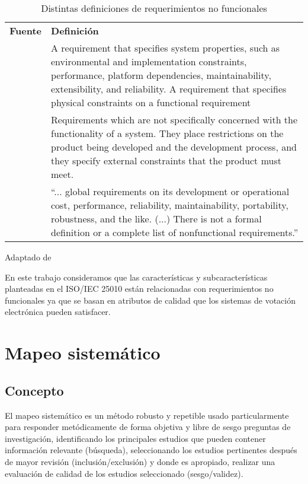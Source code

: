 \begin{table}
\centering
\renewcommand{\arraystretch}{1}
\caption{Distintas definiciones de requerimientos no funcionales}
\label{tab:definiciones-nfr}
\begin{tabularx}{\textwidth}{p{2.5cm} X} 
\toprule[1.5pt]
	\bf 	Fuente				& 	\bf 	Definición  	\\
	\cite{I.JacobsonG.Booch}	& 	A requirement that specifies system properties, such as 
								environmental and implementation constraints, performance, 
								platform dependencies, maintainability, extensibility, and reliability. 
								A requirement that specifies physical constraints on a functional requirement \\ 								
	\cite{Sommerville1998}		&	Requirements which are not specifically concerned with the functionality of a system. 
								They place restrictions on the product being developed and the 
								development process, and they specify external constraints 
								that the product must meet. \\	
	\cite{Mylopoulos1992}		&	“... global requirements on its development or operational cost, performance, 
								reliability, maintainability, portability, robustness, and the like. (...) 
								There is not a formal definition or a complete list of nonfunctional requirements.” \\
\bottomrule[0.5pt]
\end{tabularx}
\centerline{Adaptado de \cite{Glinz2007}}
\end{table}
\bigskip

En este trabajo consideramos que las características y subcaracterísticas planteadas en 
el ISO/IEC 25010 están relacionadas con requerimientos no funcionales ya que se basan
en atributos de calidad que los sistemas de votación electrónica pueden satisfacer.


\newpage
\section{Mapeo sistemático}

\subsection{Concepto}

El mapeo sistemático \cite{Budgen2007} es un método robusto y repetible usado particularmente para
responder metódicamente de forma objetiva y libre de sesgo preguntas de investigación,
identificando los principales estudios que pueden contener información relevante (búsqueda), 
seleccionando los estudios pertinentes después de mayor revisión (inclusión/exclusión) y
donde es apropiado, realizar una evaluación de calidad de los estudios seleccionado (sesgo/validez).

